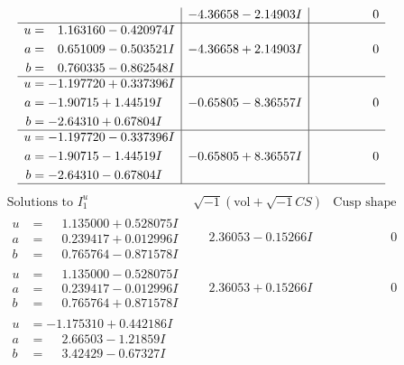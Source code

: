 \documentclass[1p]{elsarticle_modified}
\theoremstyle{definition}
\newcommand{\I}{\sqrt{-1}}
\begin{document}
$$\begin{array}{c|c|c}
 & -4.36658 - 2.14903 I & \phantom{-0.000000 } 0 \\ \hline\begin{aligned}
u &= \phantom{-}1.163160 - 0.420974 I \\
a &= \phantom{-}0.651009 - 0.503521 I \\
b &= \phantom{-}0.760335 - 0.862548 I\end{aligned}
 & -4.36658 + 2.14903 I & \phantom{-0.000000 } 0 \\ \hline\begin{aligned}
u &= -1.197720 + 0.337396 I \\
a &= -1.90715 + 1.44519 I \\
b &= -2.64310 + 0.67804 I\end{aligned}
 & -0.65805 - 8.36557 I & \phantom{-0.000000 } 0 \\ \hline\begin{aligned}
u &= -1.197720 - 0.337396 I \\
a &= -1.90715 - 1.44519 I \\
b &= -2.64310 - 0.67804 I\end{aligned}
 & -0.65805 + 8.36557 I & \phantom{-0.000000 } 0\\
 \hline 
 \end{array}$$\newpage$$\begin{array}{c|c|c}  
\text{Solutions to }I^u_{1}& \I (\text{vol} + \sqrt{-1}CS) & \text{Cusp shape}\\
 \hline 
\begin{aligned}
u &= \phantom{-}1.135000 + 0.528075 I \\
a &= \phantom{-}0.239417 + 0.012996 I \\
b &= \phantom{-}0.765764 - 0.871578 I\end{aligned}
 & \phantom{-}2.36053 - 0.15266 I & \phantom{-0.000000 } 0 \\ \hline\begin{aligned}
u &= \phantom{-}1.135000 - 0.528075 I \\
a &= \phantom{-}0.239417 - 0.012996 I \\
b &= \phantom{-}0.765764 + 0.871578 I\end{aligned}
 & \phantom{-}2.36053 + 0.15266 I & \phantom{-0.000000 } 0 \\ \hline\begin{aligned}
u &= -1.175310 + 0.442186 I \\
a &= \phantom{-}2.66503 - 1.21859 I \\
b &= \phantom{-}3.42429 - 0.67327 I\end{aligned}

\end{array}$$
\end{document}
